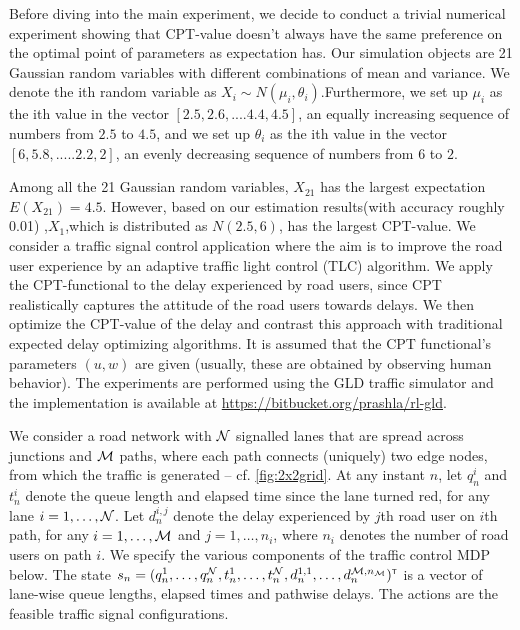 Before diving into the main experiment, we decide to conduct a trivial numerical experiment showing that CPT-value doesn't always have the same preference on the optimal point of parameters as expectation has.  Our simulation objects are 21 Gaussian random variables with different combinations of mean and variance.
We denote the ith random variable as $X_i \sim {N(\mu_i, \theta_i)}$.Furthermore, we set up $\mu_i$ as the ith value in the vector $[2.5, 2.6,....4.4,4.5]$, an equally increasing sequence of numbers from $2.5$ to $4.5$, and we set up $\theta_i$ as the ith value in the vector $[6, 5.8,.....2.2, 2]$, an evenly decreasing sequence of numbers from $6$ to $2$.

Among all the 21 Gaussian random variables, $X_{21}$ has the largest expectation $E(X_{21}) = 4.5$.
However, based on our estimation results(with accuracy roughly 0.01) ,$X_{1}$,which is distributed as $N(2.5,6)$, has the largest CPT-value.
We consider a traffic signal control application where the aim is to improve the road user experience by an adaptive traffic light control (TLC) algorithm.
We apply the CPT-functional to the delay experienced by road users, since CPT realistically captures the attitude of the road users towards delays. We then optimize the CPT-value of the delay and contrast this approach with traditional expected delay optimizing algorithms. It is assumed that the CPT functional's parameters $(u,w)$ are given (usually, these are obtained by observing human behavior). The experiments are performed using the GLD traffic simulator \cite{GLDSim} and the implementation is available at \url{https://bitbucket.org/prashla/rl-gld}.

We consider a road network with $\mathcal{N}$ signalled lanes that are spread across junctions and $\mathcal{M}$ paths, where each path connects (uniquely) two edge nodes, from which the traffic is generated -- cf. \cref{fig:2x2grid}. 
At any instant $n$, let $q_n^i$ and $t_n^i$ denote the queue length and elapsed time since the lane turned red, for any lane $i = 1,\ldots, \mathcal{N}$. Let $d_n^{i,j}$ denote the delay experienced by $j$th road user on $i$th path, for any $i=1,\ldots,\mathcal{M}$ and $j=1,\ldots,n_i$, where $n_i$ denotes the number of road users on path $i$.
We specify the various components of the traffic control MDP below.
The state $s_n=(q_n^1,\ldots,q_n^{\mathcal{N}},t_n^1,\ldots,t_n^{\mathcal{N}},d_n^{1,1},\ldots,d_n^{\mathcal{M},n_{\mathcal{M}}})^\mathsf{\scriptscriptstyle T}$ is a vector of lane-wise queue lengths, elapsed times and pathwise delays.
The actions are the feasible traffic signal configurations. 

